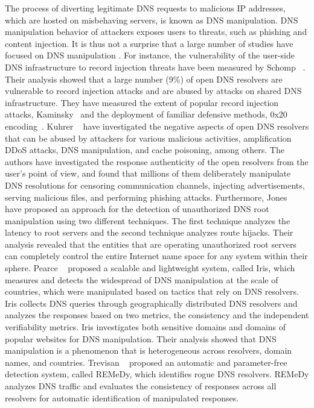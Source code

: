\label{sec:Manipulation}
The process of diverting legitimate DNS requests to malicious IP addresses, which are hosted on misbehaving servers, is known as DNS manipulation. DNS manipulation behavior of attackers exposes users to threats, such as phishing and content injection. It is thus not a surprise that a large number of studies have focused on DNS manipulation . 
For instance, the vulnerability of the user-side DNS infrastructure to record injection threats have been measured by Schomp \etal~. Their analysis showed that a large number (9\%) of open DNS resolvers are vulnerable to record injection attacks and are abused by attacks on shared DNS infrastructure. They have measured the extent of popular record injection attacks, \eg Kaminsky~ and the deployment of familiar defensive methods, \eg 0x20 encoding~.  
Kuhrer \etal~ have investigated the negative aspects of open DNS resolvers that can be abused by attackers for various malicious activities, \eg amplification DDoS attacks, DNS manipulation, and cache poisoning, among others. The authors have investigated the response authenticity of the open resolvers from the user's point of view, and found that millions of them deliberately manipulate DNS resolutions for censoring communication channels, injecting advertisements, serving malicious files, and performing phishing attacks.  Furthermore, Jones \etal~ have proposed an approach for the detection of unauthorized DNS root manipulation using two different techniques. The first technique analyzes the latency to root servers and the second technique analyzes route hijacks. Their analysis revealed that the entities that are operating unauthorized root servers can completely control the entire Internet name space for any system within their sphere. 
Pearce \etal~ proposed a scalable and lightweight system, called Iris, which measures and detects the widespread of DNS manipulation at the scale of countries, which were manipulated based on tactics that rely on DNS resolvers. Iris collects DNS queries through geographically distributed DNS resolvers and analyzes the responses based on two metrics, the consistency and the independent verifiability metrics. Iris investigates both sensitive domains and domains of popular websites for DNS manipulation. Their analysis showed that DNS manipulation is a phenomenon that is heterogeneous across resolvers, domain names, and countries.
Trevisan \etal~ proposed an automatic and parameter-free detection system, called REMeDy, which identifies rogue DNS resolvers. REMeDy analyzes DNS traffic and evaluates the consistency of responses across all resolvers for automatic identification of manipulated responses.
